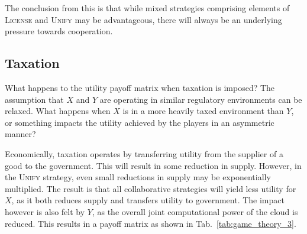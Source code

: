 The conclusion from this is that while mixed strategies comprising elements of \textsc{License} and \textsc{Unify} may be advantageous, there will always be an underlying pressure towards cooperation.

\subsection{Taxation}

What happens to the utility payoff matrix when taxation is imposed? The assumption that $X$ and $Y$ are operating in similar regulatory environments can be relaxed. What happens when $X$ is in a more heavily taxed environment than $Y$, or something impacts the utility achieved by the players in an asymmetric manner?

Economically, taxation operates by transferring utility from the supplier of a good to the government. This will result in some reduction in supply. However, in the \textsc{Unify} strategy, even small reductions in supply may be exponentially multiplied. The result is that all collaborative strategies will yield less utility for $X$, as it both reduces supply and transfers utility to government. The impact however is also felt by $Y$, as the overall joint computational power of the cloud is reduced. This results in a payoff matrix as shown in Tab.~\ref{tab:game_theory_3}.

\begin{table}[!htbp]
\captionspacetab \caption{Example utility payoff matrix in the presence of taxation on quantum computers. The effect is a net depreciation in achievable utility.}\label{tab:game_theory_3}
\end{table}

